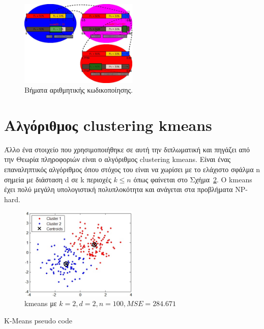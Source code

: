 \begin{itemize}
      \begin{figure}[ht!]
          \centering
          \includegraphics[width=0.5\textwidth]{chapter3/ac.jpg}
          \caption{Βήματα αριθμητικής κωδικοποίησης.}
          \label{fig:ac}
      \end{figure}
\end{itemize}

\newpage
\section{Αλγόριθμος clustering kmeans}
\label{section:sect34}

\indent Άλλο ένα στοιχείο που χρησιμοποιήθηκε σε αυτή την διπλωματική και πηγάζει από την Θεωρία πληροφοριών είναι ο αλγόριθμος clustering kmeans. Είναι ένας επαναληπτικός αλγόριθμος όπου στόχος του είναι να χωρίσει με το ελάχιστο σφάλμα n σημεία με διάσταση d σε k περιοχές $ k \leq n $ όπως φαίνεται στο Σχήμα~\ref{fig:kmeans}. O kmeans έχει πολύ μεγάλη υπολογιστική πολυπλοκότητα και ανάγεται στα προβλήματα NP-hard.

\begin{figure}[ht]
  \centering
  \includegraphics[width=0.5\textwidth]{chapter3/kmeans.jpg}
  \caption{kmeans με $k=2,d=2,n=100,MSE=284.671$}
  \label{fig:kmeans}
\end{figure}

\begin{algorithm}[H]
\begin{algorithmic}[1]
 \label{alg:kmeans:s1}
     \label{alg:kmeans:s4}
         \label{alg:kmeans:s5}
    \EndFor
    \EndFor
\EndWhile
\end{algorithmic}
\caption{K-Means pseudo code}
\label{alg:kmeans}
\end{algorithm}

